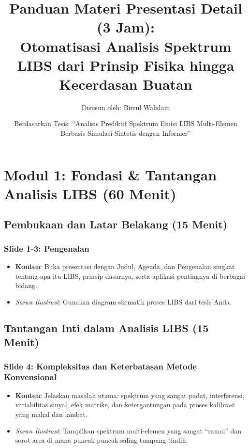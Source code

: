 \documentclass[12pt, a4paper]{article}
\title{\vspace{-2cm}\huge\bfseries Panduan Materi Presentasi Detail (3 Jam): \\ \Large Otomatisasi Analisis Spektrum LIBS dari Prinsip Fisika hingga Kecerdasan Buatan}
\author{\large Disusun oleh: Birrul Walidain}
\date{\normalsize Berdasarkan Tesis: ``Analisis Prediktif Spektrum Emisi LIBS Multi-Elemen Berbasis Simulasi Sintetis dengan Informer''}
\begin{document}
\maketitle
\thispagestyle{empty}

\tableofcontents

\section{Modul 1: Fondasi \& Tantangan Analisis LIBS (60 Menit)}

\subsection{Pembukaan dan Latar Belakang (15 Menit)}

\subsubsection*{Slide 1-3: Pengenalan}
\begin{itemize}
    \item \textbf{Konten}: Buka presentasi dengan Judul, Agenda, dan Pengenalan singkat tentang apa itu LIBS, prinsip dasarnya, serta aplikasi pentingnya di berbagai bidang.
    \item \textit{Saran Ilustrasi}: Gunakan diagram skematik proses LIBS dari tesis Anda.
\end{itemize}

\subsection{Tantangan Inti dalam Analisis LIBS (15 Menit)}

\subsubsection*{Slide 4: Kompleksitas dan Keterbatasan Metode Konvensional}
\begin{itemize}
    \item \textbf{Konten}: Jelaskan masalah utama: spektrum yang sangat padat, interferensi, variabilitas sinyal, efek matriks, dan ketergantungan pada proses kalibrasi yang mahal dan lambat.
    \item \textit{Saran Ilustrasi}: Tampilkan spektrum multi-elemen yang sangat ``ramai'' dan sorot area di mana puncak-puncak saling tumpang tindih.
\end{itemize}
\end{document}
